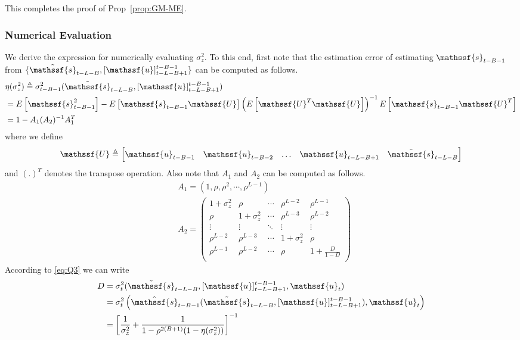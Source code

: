 \documentclass[journal, twocolumn, 10pt]{IEEEtran}
\newcommand{\rvs}{{\mathssf{s}}}    %
\newcommand{\rvu}{{\mathssf{u}}}    %
\newcommand{\rvU}{{\mathssf{U}}}
\begin{document}
{This completes the proof of Prop~\ref{prop:GM-ME}.


\subsubsection{Numerical Evaluation} We derive the expression for numerically evaluating $\sigma_z^2$. To this end, first note that the estimation error of estimating $\rvs_{t-B-1}$ from $\{\tilde{\rvs}_{t-L-B}, [\rvu]_{t-L-B+1}^{t-B-1}\}$ can be computed as follows.
\begin{align}
&\eta (\sigma^{2}_{z})\triangleq \sigma^{2}_{t-B-1}(\tilde{\rvs}_{t-L-B}, [\rvu]_{t-L-B+1}^{t-B-1}) \notag\\
&= E\left[\rvs^2_{t-B-1}\right] - E\left[\rvs_{t-B-1}{\rvU}\right] \left(E\left[{\rvU}^{T}{\rvU}\right]\right)^{-1} E\left[\rvs_{t-B-1}{\rvU}^{T}\right] \label{eq:MMSE1}\\
& = 1- A_1 (A_2)^{-1} A_1^T
\end{align}  where we define  $${\rvU}\triangleq \begin{bmatrix}  \rvu_{t-B-1} & \rvu_{t-B-2} & \ldots & \rvu_{t-L-B+1} & \tilde{\rvs}_{t-L-B}\end{bmatrix}$$ and $(.)^T$ denotes the transpose operation. Also note that $A_1$ and $A_2$ can be computed as follows.
\begin{align}
&A_1= (1 , \rho , \rho^2 , \cdots , \rho^{L-1})\\
& A_2= \begin{pmatrix}
1+\sigma^2_{z} & \rho &\cdots & \rho^{L-2} & \rho^{L-1}\\
\rho & 1+\sigma^2_{z} &\cdots & \rho^{L-3} & \rho^{L-2}\\
\vdots & \vdots & \ddots & \vdots & \vdots \\
\rho^{L-2}  &\rho^{L-3}  &\cdots & 1+\sigma^2_{z} & \rho\\
\rho^{L-1}  &\rho^{L-2}  &\cdots & \rho &1+\frac{D}{1-D}\\
\end{pmatrix}
\end{align} According to \eqref{eq:Q3} we can write 
\begin{align}
D &= \sigma^{2}_{t}( \tilde{\rvs}_{t-L-B}, [\rvu]_{t-L-B+1}^{t-B-1}, \rvu_{t}) \\
 &=  \sigma^{2}_{t}\left( \hat{\rvs}_{t-B-1}(\tilde{\rvs}_{t-L-B}, [\rvu]_{t-L-B+1}^{t-B-1}), \rvu_{t}\right)\notag\\
& = \left[\frac{1}{\sigma^2_{z}}+ \frac{1}{1-\rho^{2(B+1)}(1-\eta (\sigma^{2}_{z})) }\right]^{-1} \label{eq:solveD}

\end{align}}
\end{document}
